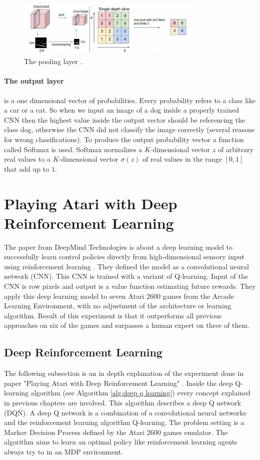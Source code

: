 \documentclass[conference]{IEEEtran}
\begin{document}
\begin{figure}[!t]
\centering
\includegraphics[width=3.5in]{pooling_layer}
\caption{The pooling layer \cite{KarpathyCNN}.}
\label{fig:pooling_layer}
\end{figure}

\paragraph{The output layer} is a one dimensional vector of probabilities. Every probability refers to a class like a car or a cat. So when we input an image of a dog inside a properly trained CNN then the highest value inside the output vector should be referencing the class dog, otherwise the CNN did not classify the image correctly (several reasons for wrong classifications).   To produce the output probability vector a function called Softmax is used. Softmax normalizes a $K$-dimensional vector $z$ of arbitrary real values to a $K$-dimensional vector $\sigma(z)$ of real values in the range $[0,1]$ that add up to $1$.

\section{Playing Atari with Deep Reinforcement Learning}
The paper from DeepMind Technologies is about a deep learning model to successfully learn control policies directly from high-dimensional sensory input using reinforcement learning \cite{mnih-atari-2013}. They defined the model as a convolutional neural network (CNN). This CNN is trained with a variant of Q-learning. Input of the CNN is row pixels and output is a value function estimating future rewards. They apply this deep learning model to seven Atari 2600 games from the Arcade Learning Environment, with no adjustment of the architecture or learning algorithm. Result of this experiment is that it outperforms all previous approaches on six of the games and surpasses a human expert on three of them. 

\subsection{Deep Reinforcement Learning}
The following subsection is an in depth explanation of the experiment done in paper "Playing Atari with Deep Reinforcement Learning" \cite{mnih-atari-2013}. Inside the deep Q-learning algorithm (see Algorithm \ref{alg:deep q learning}) every concept explained in previous chapters are involved. This algorithm describes a deep Q network (DQN). A deep Q network is a combination of a convolutional neural networks and the reinforcement learning algorithm Q-learning. The problem setting is a Markov Decision Process defined by the Atari 2600 games emulator. The algorithm aims to learn an optimal policy like reinforcement learning agents always try to in an MDP environment.
\end{document}
